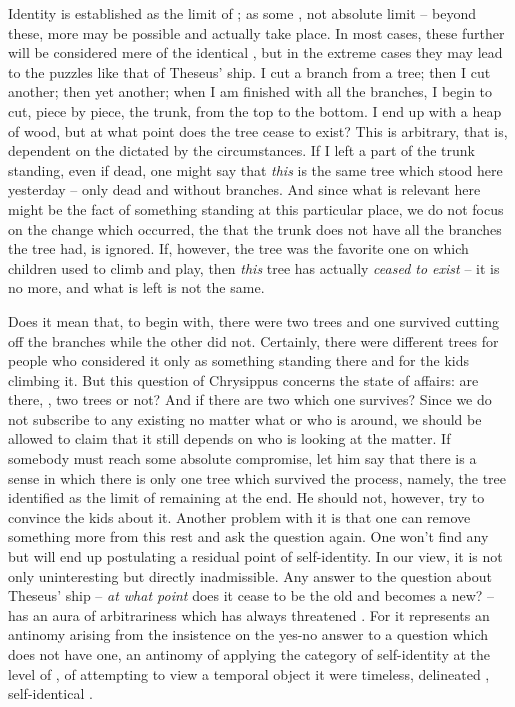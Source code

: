 Identity is established as the limit of ; as some
, not absolute limit -- beyond these, more  may be
possible and actually take place.  In most cases, these further
 will be considered mere  of the identical
, but in the extreme cases they may lead to the puzzles like that
of Theseus' ship.  I cut a branch from a tree; then I cut another; then yet
another; when I am finished with all the branches, I begin to cut, piece by
piece, the trunk, from the top to the bottom.  I end up with a heap of wood, but
at what point does the tree cease to exist?  This is arbitrary, that is,
dependent on the  dictated by the circumstances.  If I left a
part of the trunk standing, even if dead, one might say that {\em this} is the
same tree which stood here yesterday -- only dead and without branches.  And
since what is relevant here might be the fact of something standing at this
particular place, we do not focus on the change which occurred, the
 that the trunk does not have all the branches the tree had, is
ignored.  If, however, the tree was the favorite one on which children used to
climb and play, then {\em this} tree has actually {\em ceased to exist} -- it is
no more, and what is left is not the same.

Does it mean that, to begin with, there were two trees and one survived cutting
off the branches while the other did not. Certainly, there were different trees
for people who considered it only as something standing there and for the kids
climbing it. But this question of Chrysippus concerns the  state
of affairs: are there, , two trees or not? And if there are two
which one survives?  Since we do not subscribe to any 
existing  no matter what or who is around, we should be allowed
to claim that it still depends on who is looking at the matter.  If somebody
must reach some absolute compromise, let him say that there is a sense in which
there is only one tree which survived the process, namely, the tree identified
as the limit of  remaining at the end. He should not, however,
try to convince the kids about it. Another problem with it is that one can
remove something more from this rest and ask the question again.  One won't find
any  but will end up postulating a residual point of self-identity.
In our view, it is not only uninteresting but directly inadmissible.  Any answer
to the question about Theseus' ship -- {\em at what point} does it cease to be
the old and becomes a new? -- has an aura of arbitrariness which has always
threatened . For it represents an antinomy arising from the
insistence on the yes-no answer to a question which does not have one, an
antinomy of applying the  category of self-identity at the level
of , of attempting to view a temporal object  it were
timeless,  delineated , self-identical
.


